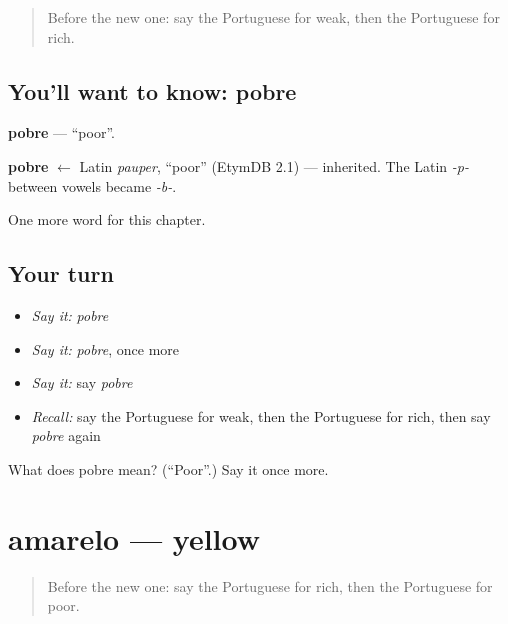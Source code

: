 \label{lesson:PT-C68-pobre}



\begin{quote}
Before the new one: say the Portuguese for weak, then the Portuguese for rich.
\end{quote}

\subsection*{You'll want to know: pobre}
\textbf{pobre} — \textquotedblleft{}poor\textquotedblright{}.

\begin{cousinweb}
\textbf{pobre} $\leftarrow$ Latin \emph{pauper}, \textquotedblleft{}poor\textquotedblright{} (EtymDB 2.1) — inherited. The Latin \emph{-p-} between vowels became \emph{-b-}.
\end{cousinweb}

\begin{grammarlens}[title={What you've built}]
One more word for this chapter.
\end{grammarlens}

\subsection*{Your turn}
\begin{itemize}
\raggedright
  \item \emph{Say it:} \emph{pobre}
  \item \emph{Say it:} \emph{pobre}, once more
  \item \emph{Say it:} say \emph{pobre}
  \item \emph{Recall:} say the Portuguese for weak, then the Portuguese for rich, then say \emph{pobre} again
\end{itemize}

\begin{tcolorbox}[breakable,colback=teal!4,colframe=teal!35!black,title={Before you move on}]
What does pobre mean? (\textquotedblleft{}Poor\textquotedblright{}.) Say it once more.
\end{tcolorbox}
\section[amarelo]{amarelo — yellow}

\label{lesson:PT-C68-amarelo}



\begin{quote}
Before the new one: say the Portuguese for rich, then the Portuguese for poor.
\end{quote}

